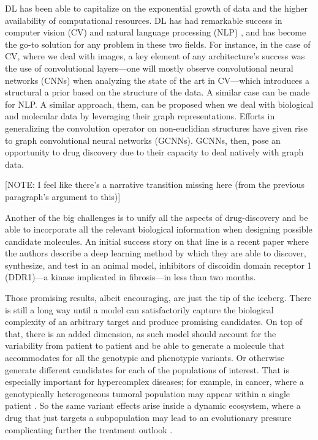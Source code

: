 \documentclass{article}
\begin{document}
DL has been able to capitalize on the exponential growth of data and the higher
 availability of computational resources. DL has had remarkable success in computer
 vision (CV) \cite{Guo2016} and natural language processing (NLP) \cite{Young2018}, and
 has become the go-to solution for any problem in these two fields. For instance, in the
 case of CV, where we deal with images, a key element of any architecture's success was
 the use of convolutional layers---one will mostly observe convolutional neural networks
 (CNNs) when analyzing the state of the art in CV---which introduces a structural a
 prior based on the structure of the data\cite{Fukushima1980, LeCun1989, Ulyanov}. A
 similar case can be made for NLP. A similar approach, them, can be proposed when we
 deal with biological and molecular data by leveraging their graph representations.
 Efforts in generalizing the convolution operator on non-euclidian structures have given
 rise to graph convolutional neural networks (GCNNs)\cite{Wu2019}. GCNNs, then, pose an
 opportunity to drug discovery due to their capacity to deal natively with graph
 data\cite{Sun2019}.

{\color{red} [NOTE: I feel like there's a narrative transition missing here (from the
previous paragraph's argument to this)]}

{\color{red}Another of the big challenges is to unify all the aspects of drug-discovery
 and be able to incorporate all the relevant biological information when designing
 possible candidate molecules.} An initial success story on that line is a recent paper
 \cite{Zhavoronkov2019} where the authors describe a deep learning method by which they
 are able to discover, synthesize, and test in an animal model, inhibitors of discoidin
 domain receptor 1 (DDR1)—a kinase implicated in fibrosis—in less than two months.

Those promising results, albeit encouraging, are just the tip of the iceberg. There is
 still a long way until a model can satisfactorily capture the biological complexity of
 an arbitrary target and produce promising candidates. On top of that, there is an added
 dimension, as such model should account for the variability from patient to patient and
 be able to generate a molecule that accommodates for all the genotypic and phenotypic
 variants. Or otherwise generate different candidates for each of the populations of
 interest. That is especially important for hypercomplex diseases; for example, in
 cancer, where a genotypically heterogeneous tumoral population may appear within a
 single patient \cite{Boland2017}. So the same variant effects arise inside a dynamic
 ecosystem, where a drug that just targets a subpopulation may lead to an evolutionary
 pressure complicating further the treatment outlook \cite{Enriquez-Navas2015}.
\end{document}
